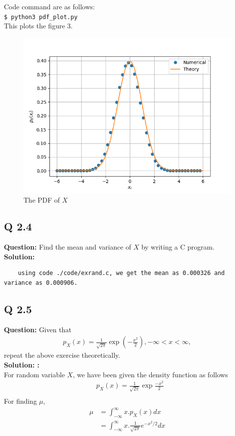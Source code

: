 \documentclass[journal,12pt,twocolumn]{IEEEtran}
\providecommand{\brak}[1]{\ensuremath{\left(#1\right)}}
\begin{document}
\noindent Code command are as follows:\\
\texttt{\$ python3 pdf\_plot.py}\\
This plots the figure 3.

\begin{figure}[!ht]
\centering
\includegraphics[width=\columnwidth]{./figs/Figure_3.png}
\caption{The PDF of $X$}
\label{fig:PDF_X}
\end{figure}




\subsection {Q 2.4}
\noindent \textbf{Question: } Find the mean and variance of $X$ by writing a C program.\\
\noindent \textbf{Solution: }\\
\begin{lstlisting}
    using code ./code/exrand.c, we get the mean as 0.000326 and variance as 0.000906.
\end{lstlisting}


\subsection {Q 2.5}
\noindent \textbf{Question: }Given that\\ 
\begin{align}
p_{X}(x) = \frac{1}{\sqrt{2\pi}}\exp\brak{-\frac{x^2}{2}}, -\infty < x < \infty,
\end{align}
repeat the above exercise theoretically.\\
\noindent \textbf{Solution: :}\\
For random variable $X$, we have been given the density function as follows
    \begin{align}
        &p_X(x) = \frac{1}{\sqrt{2\pi}}\exp{\frac{-x^2}{2}}\\
    \end{align}
For finding $\mu$,
\begin{align}
    \mu &= \int _ {- \infty} ^ {\infty} {x . p_X(x) dx} \\
    &= \int _ {- \infty} ^ {\infty} {x . \frac{1}{\sqrt{2 \pi}} e^{-x^2 / 2} dx}
\end{align}
\end{document}
